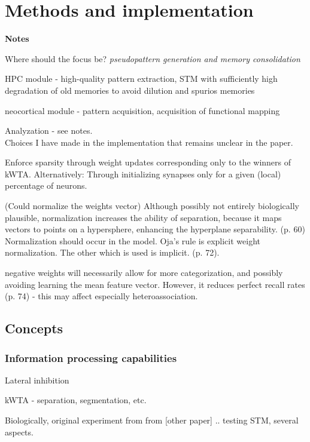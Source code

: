 
\chapter{Methods and implementation}\label{chpt:methods}

\textbf{Notes}

Where should the focus be? \textit{pseudopattern generation and memory consolidation}

HPC module - high-quality pattern extraction, STM with sufficiently high degradation of old memories to avoid dilution and spurios memories

neocortical module - pattern acquisition, acquisition of functional mapping

Analyzation - see notes.
\\

Choices I have made in the implementation that remains unclear in the paper.

Enforce sparsity through weight updates corresponding only to the winners of kWTA.
Alternatively: Through initializing synapses only for a given (local) percentage of neurons.

(Could normalize the weights vector)
Although possibly not entirely biologically plausible, normalization increases the ability of separation, because it maps vectors to points on a hypersphere, enhancing the hyperplane separability. (p. 60)
Normalization should occur in the model. Oja's rule is explicit weight normalization. The other which is used is implicit. (p. 72).

negative weights will necessarily allow for more categorization, and possibly avoiding learning the mean feature vector. However, it reduces perfect recall rates (p. 74) - this may affect especially heteroassociation.

\section{Concepts}
\subsection{Information processing capabilities}

Lateral inhibition

kWTA - separation, segmentation, etc.

Biologically, original experiment from \citep{Hattori2014} from [other paper] .. testing STM, several aspects.

